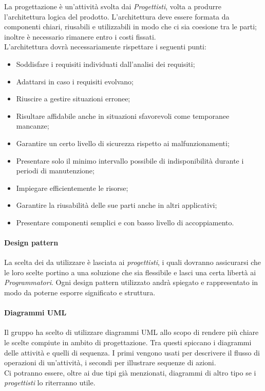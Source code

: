 La progettazione è un'attività svolta dai \emph{Progettisti}, volta a produrre l'architettura logica del prodotto. 
L'architettura deve essere formata da componenti chiari, riusabili e utilizzabili in modo che ci sia coesione tra 
le parti; inoltre è necessario rimanere entro i costi fissati.\\
L'architettura dovrà necessariamente rispettare i seguenti punti: 
\begin{itemize}
    \item Soddisfare i requisiti individuati dall'analisi dei requisiti;
    \item Adattarsi in caso i requisiti evolvano;
    \item Riuscire a gestire situazioni erronee;
    \item Risultare affidabile anche in situazioni sfavorevoli come temporanee mancanze;
    \item Garantire un certo livello di sicurezza rispetto ai malfunzionamenti;
    \item Presentare solo il minimo intervallo possibile di indisponibilità durante i periodi di manutenzione;
    \item Impiegare efficientemente le risorse;
    \item Garantire la riusabilità delle sue parti anche in altri applicativi;
    \item Presentare componenti semplici e con basso livello di accoppiamento.
\end{itemize}
 
\paragraph{Design pattern}

La scelta dei  da utilizzare è lasciata ai \emph{progettisti}, i quali dovranno 
assicurarsi che le loro scelte portino a una soluzione che sia flessibile e lasci una certa libertà ai 
\emph{Programmatori}. Ogni design pattern utilizzato andrà spiegato e rappresentato in modo da poterne esporre 
significato e struttura.

\paragraph{Diagrammi UML}

Il gruppo ha scelto di utilizzare diagrammi UML allo scopo di rendere più chiare le scelte compiute in ambito di 
progettazione. Tra questi spiccano i diagrammi delle attività e quelli di sequenza. I primi vengono 
usati per descrivere il flusso di operazioni di un'attività, i secondi per illustrare sequenze di azioni.\\
Ci potranno essere, oltre ai due tipi già menzionati, diagrammi di altro tipo se i \emph{progettisti} lo riterranno 
utile.

